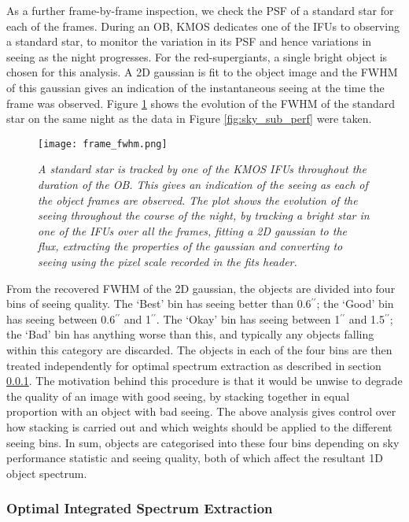 \documentclass{literature}
\begin{document}
As a further frame-by-frame inspection, we check the PSF of a standard star for each of the frames. During an OB, KMOS dedicates one of the IFUs to observing a standard star, to monitor the variation in its PSF and hence variations in seeing as the night progresses. For the red-supergiants, a single bright object is chosen for this analysis. A 2D gaussian is fit to the object image and the FWHM of this gaussian gives an indication of the instantaneous seeing at the time the frame was observed. Figure \ref{fig:fwhm_track} shows the evolution of the FWHM of the standard star on the same night as the data in Figure \ref{fig:sky_sub_perf} were taken.

\begin{figure}[!htp]
\centering
\texttt{[image: frame\_fwhm.png]}
\caption{\footnotesize{\emph{A standard star is tracked by one of the KMOS IFUs throughout the duration of the OB. This gives an indication of the seeing as each of the object frames are observed. The plot shows the evolution of the seeing throughout the course of the night, by tracking a bright star in one of the IFUs over all the frames, fitting a 2D gaussian to the flux, extracting the properties of the gaussian and converting to seeing using the pixel scale recorded in the fits header.}}}
\label{fig:fwhm_track}
\end{figure}

From the recovered FWHM of the 2D gaussian, the objects are divided into four bins of seeing quality. The `Best' bin has seeing better than 0.6$^{\prime\prime}$; the `Good' bin has seeing between 0.6$^{\prime\prime}$ and 1$^{\prime\prime}$. The `Okay' bin has seeing between 1$^{\prime\prime}$ and 1.5$^{\prime\prime}$; the `Bad' bin has anything worse than this, and typically any objects falling within this category are discarded. The objects in each of the four bins are then treated independently for optimal spectrum extraction as described in section \ref{subsubsec:optimal_spec_extract}. The motivation behind this procedure is that it would be unwise to degrade the quality of an image with good seeing, by stacking together in equal proportion with an object with bad seeing. The above analysis gives control over how stacking is carried out and which weights should be applied to the different seeing bins. In sum, objects are categorised into these four bins depending on sky performance statistic and seeing quality, both of which affect the resultant 1D object spectrum.  


\subsubsection{Optimal Integrated Spectrum Extraction}\label{subsubsec:optimal_spec_extract}
\end{document}
